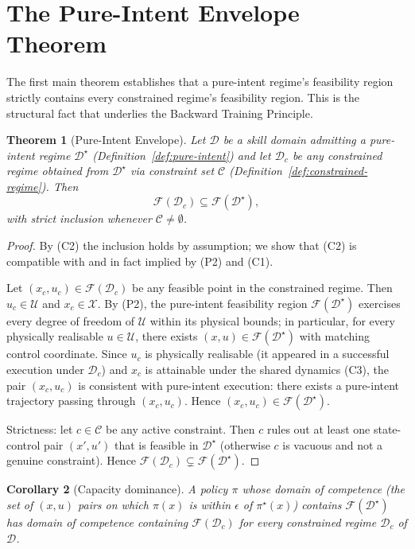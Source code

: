 \documentclass[twocolumn,11pt,a4paper]{article}
\newtheorem{theorem}{Theorem}[section]
\newtheorem{corollary}[theorem]{Corollary}
\newcommand{\cD}{\mathcal{D}}
\newcommand{\cF}{\mathcal{F}}
\newcommand{\cC}{\mathcal{C}}
\newcommand{\cU}{\mathcal{U}}
\newcommand{\cX}{\mathcal{X}}
\begin{document}
\section{The Pure-Intent Envelope Theorem}
\label{sec:envelope}

The first main theorem establishes that a pure-intent regime's feasibility region strictly contains every constrained regime's feasibility region. This is the structural fact that underlies the Backward Training Principle.

\begin{theorem}[Pure-Intent Envelope]
\label{thm:envelope}
Let $\cD$ be a skill domain admitting a pure-intent regime $\cD^\star$ (Definition~\ref{def:pure-intent}) and let $\cD_c$ be any constrained regime obtained from $\cD^\star$ via constraint set $\cC$ (Definition~\ref{def:constrained-regime}). Then
\begin{equation}
\cF(\cD_c) \subseteq \cF(\cD^\star),
\end{equation}
with strict inclusion whenever $\cC \neq \emptyset$.
\end{theorem}

\begin{proof}
By (C2) the inclusion holds by assumption; we show that (C2) is compatible with and in fact implied by (P2) and (C1).

Let $(x_c, u_c) \in \cF(\cD_c)$ be any feasible point in the constrained regime. Then $u_c \in \cU$ and $x_c \in \cX$. By (P2), the pure-intent feasibility region $\cF(\cD^\star)$ exercises every degree of freedom of $\cU$ within its physical bounds; in particular, for every physically realisable $u \in \cU$, there exists $(x, u) \in \cF(\cD^\star)$ with matching control coordinate. Since $u_c$ is physically realisable (it appeared in a successful execution under $\cD_c$) and $x_c$ is attainable under the shared dynamics (C3), the pair $(x_c, u_c)$ is consistent with pure-intent execution: there exists a pure-intent trajectory passing through $(x_c, u_c)$. Hence $(x_c, u_c) \in \cF(\cD^\star)$.

Strictness: let $c \in \cC$ be any active constraint. Then $c$ rules out at least one state-control pair $(x', u')$ that is feasible in $\cD^\star$ (otherwise $c$ is vacuous and not a genuine constraint). Hence $\cF(\cD_c) \subsetneq \cF(\cD^\star)$.
\end{proof}

\begin{corollary}[Capacity dominance]
\label{cor:capacity}
A policy $\pi$ whose \emph{domain of competence} (the set of $(x, u)$ pairs on which $\pi(x)$ is within $\epsilon$ of $\pi^\star(x)$) contains $\cF(\cD^\star)$ has domain of competence containing $\cF(\cD_c)$ for every constrained regime $\cD_c$ of $\cD$.
\end{corollary}
\end{document}
